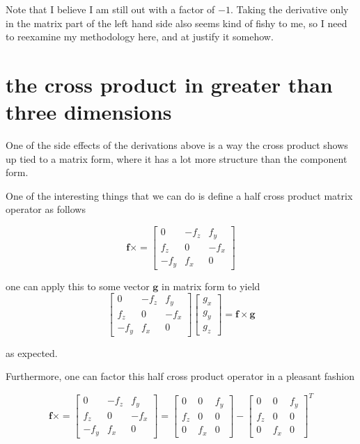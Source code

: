 \documentclass{article}      %
\newcommand{\Bf}[0]{\mathbf{f}}
\newcommand{\Bg}[0]{\mathbf{g}}
\newcommand{\cross}[0]{\times}
\begin{document}
Note that I believe I am still out with a factor of $-1$.
Taking the derivative only in
the matrix part of the left hand side also seems kind of fishy to me, so I need to reexamine
my methodology here, and at justify it somehow.

\section{the cross product in greater than three dimensions}

One of the side effects of the derivations above is a way the cross product shows up
tied
to a
matrix form, where it has a lot more structure than the component form.

One of the interesting things that we can do is define a half cross product matrix operator as follows

\begin{equation*}
\Bf \cross =
\begin{bmatrix}
0 & -f_z & f_y \\
f_z & 0 & -f_x \\
-f_y & f_x & 0
\end{bmatrix}
\end{equation*}

one can apply this to some vector $\Bg$ in matrix form to yield
\begin{equation*}
\begin{bmatrix}
0 & -f_z & f_y \\
f_z & 0 & -f_x \\
-f_y & f_x & 0
\end{bmatrix}
\begin{bmatrix}
g_x \\
g_y \\
g_z
\end{bmatrix}
= \Bf \cross \Bg
\end{equation*}

as expected.

Furthermore, one can factor this half cross product operator in a pleasant fashion

\begin{equation*}
\Bf \cross =
\begin{bmatrix}
0 & -f_z & f_y \\
f_z & 0 & -f_x \\
-f_y & f_x & 0
\end{bmatrix}
=
\begin{bmatrix}
0 & 0 & f_y \\
f_z & 0 & 0 \\
0 & f_x & 0
\end{bmatrix}
-
\begin{bmatrix}
0 & 0 & f_y \\
f_z & 0 & 0 \\
0 & f_x & 0
\end{bmatrix}^T
\end{equation*}
\end{document}
